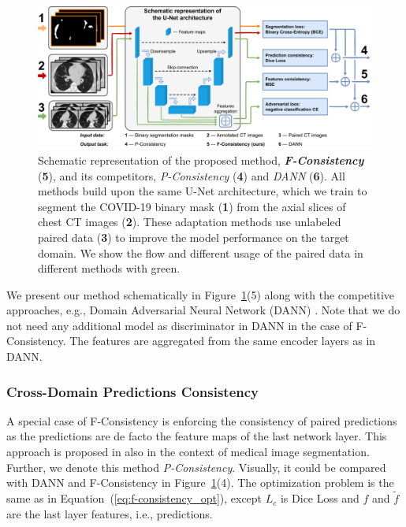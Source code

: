 \begin{figure}[h]
	\centering
	\includegraphics[width=\textwidth]{Dissertation/Figures/3_ct/method_schematic_4.pdf}
	\caption{Schematic representation of the proposed method, \textit{\textbf{F-Consistency}} (\textbf{5}), and its competitors, \textit{P-Consistency} (\textbf{4}) and \textit{DANN} (\textbf{6}). All methods build upon the same U-Net architecture, which we train to segment the COVID-19 binary mask (\textbf{1}) from the axial slices of chest CT images (\textbf{2}). These adaptation methods use unlabeled paired data (\textbf{3}) to improve the model performance on the target domain. We show the flow and different usage of the paired data in different methods with green.\label{fig:method_schematic}}
\end{figure}

We present our method schematically in Figure~\ref{fig:method_schematic}(5) along with the competitive approaches, e.g., Domain Adversarial Neural Network (DANN) \cite{ganin2015unsupervised}. Note that we do not need any additional model as discriminator in DANN in the case of F-Consistency. The features are aggregated from the same encoder layers as in DANN.


\subsubsection{Cross-Domain Predictions Consistency}

A special case of F-Consistency is enforcing the consistency of paired predictions as the predictions are de facto the feature maps of the last network layer. This approach is proposed in \cite{orbes2019multi} also in the context of medical image segmentation. Further, we denote this method \textit{P-Consistency}. Visually, it could be compared with DANN and F-Consistency in Figure~\ref{fig:method_schematic}(4). The optimization problem is the same as in Equation~(\ref{eq:f-consistency_opt}), except $L_c$ is Dice Loss \cite{milletari2016v} and $f$ and $\tilde{f}$ are the last layer features, i.e., predictions.


